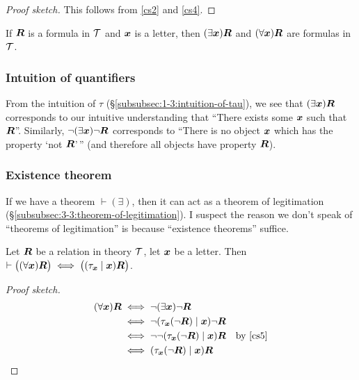 \begin{proof}[Proof sketch]
This follows from \ref{cs2} and \ref{cs4}.
\end{proof}

\begin{cf}\label{cf11}%
If $\boldsymbol{R}$ is a formula in $\mathcal{T}$ and
$\boldsymbol{x}$ is a letter, then
$(\exists\boldsymbol{x})\boldsymbol{R}$ and
$(\forall\boldsymbol{x})\boldsymbol{R}$ are formulas in $\mathcal{T}$.
\end{cf}

\subsubsection{Intuition of quantifiers}
From the intuition of $\tau$ (\S\ref{subsubsec:1-3:intuition-of-tau}),
we see that $(\exists\boldsymbol{x})\boldsymbol{R}$ corresponds to
our intuitive understanding that ``There exists some $\boldsymbol{x}$
such that $\boldsymbol{R}$''. Similarly,
$\neg(\exists\boldsymbol{x})\neg\boldsymbol{R}$ corresponds to
``There is no object $\boldsymbol{x}$ which has the property `not
$\boldsymbol{R}$'\,'' (and therefore all objects have property
$\boldsymbol{R}$).

\subsubsection{Existence theorem}\label{subsubsec:4-1:existence-thms}
If we have a theorem $\vdash(\exists)$, then it can act as a theorem of
legitimation (\S\ref{subsubsec:3-3:theorem-of-legitimation}). I suspect
the reason we don't speak of ``theorems of legitimation'' is because
``existence theorems'' suffice.

\begin{dc}\label{c26}%
Let $\boldsymbol{R}$ be a relation in theory $\mathcal{T}$, let
$\boldsymbol{x}$ be a letter. Then $\vdash\bigl((\forall\boldsymbol{x})\boldsymbol{R}\bigr)\iff\bigl((\tau_{\boldsymbol{x}}\mid\boldsymbol{x})\boldsymbol{R}\bigr)$.
\end{dc}

\begin{proof}[Proof sketch]
\begin{align*}
(\forall\boldsymbol{x})\boldsymbol{R} &\iff\neg(\exists\boldsymbol{x})\neg\boldsymbol{R}\\
&\iff\neg(\tau_{\boldsymbol{x}}(\neg\boldsymbol{R})\mid\boldsymbol{x})\neg\boldsymbol{R}\\
&\iff\neg\neg(\tau_{\boldsymbol{x}}(\neg\boldsymbol{R})\mid\boldsymbol{x})\boldsymbol{R}\quad\mbox{by \ref{cs5}}\\
&\iff(\tau_{\boldsymbol{x}}(\neg\boldsymbol{R})\mid\boldsymbol{x})\boldsymbol{R}\qedhere
\end{align*}
\end{proof}

